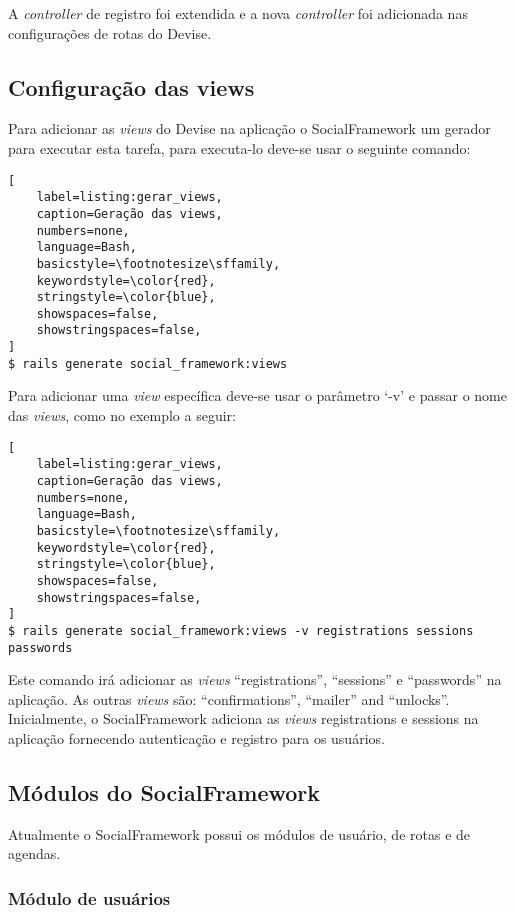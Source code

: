 A \textit{controller} de registro foi extendida e a nova \textit{controller} foi adicionada nas configurações de rotas do Devise.

\subsection{Configuração das views}

Para adicionar as \textit{views} do Devise na aplicação o SocialFramework um gerador para executar esta tarefa, para executa-lo deve-se usar o seguinte comando:

\begin{lstlisting}[
    label=listing:gerar_views,
    caption=Geração das views,
    numbers=none,
    language=Bash,
    basicstyle=\footnotesize\sffamily,
    keywordstyle=\color{red},
    stringstyle=\color{blue},
    showspaces=false,
    showstringspaces=false,
]
$ rails generate social_framework:views
\end{lstlisting}

Para adicionar uma \textit{view} específica deve-se usar o parâmetro `-v' e passar o nome das \textit{views}, como no exemplo a seguir:

\begin{lstlisting}[
    label=listing:gerar_views,
    caption=Geração das views,
    numbers=none,
    language=Bash,
    basicstyle=\footnotesize\sffamily,
    keywordstyle=\color{red},
    stringstyle=\color{blue},
    showspaces=false,
    showstringspaces=false,
]
$ rails generate social_framework:views -v registrations sessions passwords
\end{lstlisting}

Este comando irá adicionar as \textit{views} ``registrations'', ``sessions'' e ``passwords'' na aplicação. As outras \textit{views} são: ``confirmations'', ``mailer'' and ``unlocks''. Inicialmente, o SocialFramework adiciona as \textit{views} registrations e sessions na aplicação fornecendo autenticação e registro para os usuários.

\subsection{Módulos do SocialFramework}

Atualmente o SocialFramework possui os módulos de usuário, de rotas e de agendas.

\subsubsection{Módulo de usuários}

